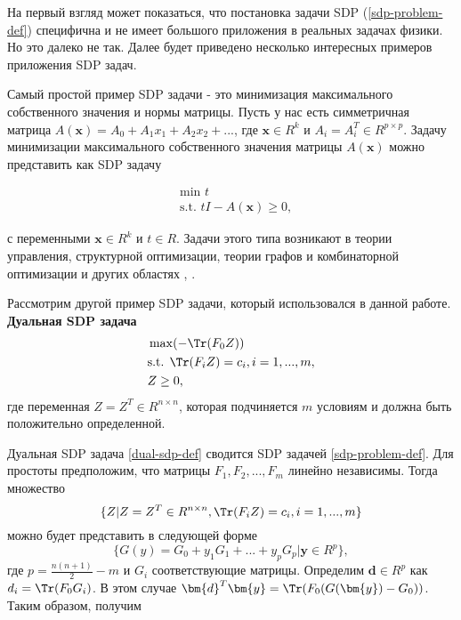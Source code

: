 На первый взгляд может показаться, что постановка задачи SDP
(\ref{sdp-problem-def}) специфична и не имеет большого приложения
в реальных задачах физики. Но это далеко не так. Далее будет приведено несколько интересных примеров приложения SDP задач.

Самый простой пример SDP задачи - это минимизация максимального собственного значения и нормы матрицы.
Пусть у нас есть симметричная матрица 
$A(\bm{x}) = A_0 + A_1 x_1 + A_2 x_2 + ...$, где $\bm{x} \in R^k$ и $A_i = A_i^T \in R^{p \times p}$.
Задачу минимизации максимального собственного значения матрицы $A(\bm{x})$ можно представить как 
SDP задачу

\begin{equation}
    \begin{split}
        & \text{min }t \\
        & \text{s.t. } tI - A(\bm{x}) \geq 0,
    \end{split}
\end{equation}

с переменными $\bm{x}\in R^{k}$ и $t \in R$.
Задачи этого типа возникают в теории управления, 
структурной оптимизации, теории графов и комбинаторной оптимизации и других областях
\cite{overton}, \cite{brualdi}.

Рассмотрим другой пример SDP задачи, который использовался в данной работе. \textbf{Дуальная SDP задача}
\begin{equation}\label{dual-sdp-def}
    \begin{split}
        & \max(-\Tr(F_0 Z)) \\
        & \text{s.t. } \Tr(F_i Z) =  c_i, i = 1,...,m, \\
        & Z \geq 0,
    \end{split}
\end{equation}
где переменная $Z = Z^{T} \in R^{n \times n}$, которая подчиняется $m$ условиям и должна быть положительно определенной.

Дуальная SDP задача \ref{dual-sdp-def} сводится SDP задачей \ref{sdp-problem-def}.
Для простоты предположим, что матрицы $F_1, F_2, ..., F_m$ линейно независимы. Тогда множество
\begin{equation}
    \{ Z | Z = Z^T \in R^{n \times n}, \Tr(F_i Z) = c_i, i=1, ..., m \}
\end{equation}
можно будет представить в следующей форме
\begin{equation}
    \{ G(y) = G_0 + y_1 G_1 + ... + y_p G_p | \bm{y} \in R^p \},
\end{equation}
где $p = \frac{n(n+1)}{2} - m$ и $G_i$ соответствующие матрицы. Определим $\bm{d} \in R^p$ как $d_i = \Tr(F_0 G_i)$. В этом случае $\bm{d}^T \bm{y} = \Tr(F_0(G(\bm{y}) - G_0))$. Таким образом, получим

